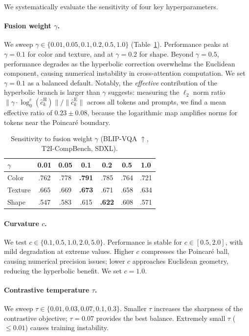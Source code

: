 \documentclass[sigconf,nonacm]{acmart}
\begin{document}
\setcounter{table}{0}

We systematically evaluate the sensitivity of four key hyperparameters.

\paragraph{Fusion weight $\gamma$.} We sweep $\gamma \in \{0.01, 0.05, 0.1, 0.2, 0.5, 1.0\}$ (Table~\ref{tab:gamma}). Performance peaks at $\gamma=0.1$ for color and texture, and at $\gamma=0.2$ for shape. Beyond $\gamma=0.5$, performance degrades as the hyperbolic correction overwhelms the Euclidean component, causing numerical instability in cross-attention computation. We set $\gamma=0.1$ as a balanced default. Notably, the \emph{effective} contribution of the hyperbolic branch is larger than $\gamma$ suggests: measuring the $\ell_2$ norm ratio $\|\gamma \cdot \log_0^c(\hat{c}_k^{\text{H}})\| / \|\hat{c}_k^{\text{E}}\|$ across all tokens and prompts, we find a mean effective ratio of $0.23 \pm 0.08$, because the logarithmic map amplifies norms for tokens near the Poincar\'e boundary.

\begin{table}[t]
\centering
\caption{Sensitivity to fusion weight $\gamma$ (BLIP-VQA $\uparrow$, T2I-CompBench, SDXL).}
\label{tab:gamma}
\begin{tabular}{l cccccc}
\toprule
$\gamma$ & 0.01 & 0.05 & \textbf{0.1} & 0.2 & 0.5 & 1.0 \\
\midrule
Color  & .762 & .778 & \textbf{.791} & .785 & .764 & .721 \\
Texture & .665 & .669 & \textbf{.673} & .671 & .658 & .634 \\
Shape  & .547 & .583 & .615 & \textbf{.622} & .608 & .571 \\
\bottomrule
\end{tabular}
\end{table}

\paragraph{Curvature $c$.} We test $c \in \{0.1, 0.5, 1.0, 2.0, 5.0\}$. Performance is stable for $c \in [0.5, 2.0]$, with mild degradation at extreme values. Higher $c$ compresses the Poincar\'e ball, causing numerical precision issues; lower $c$ approaches Euclidean geometry, reducing the hyperbolic benefit. We set $c=1.0$.

\paragraph{Contrastive temperature $\tau$.} We sweep $\tau \in \{0.01, 0.03, 0.07, 0.1, 0.3\}$. Smaller $\tau$ increases the sharpness of the contrastive objective; $\tau=0.07$ provides the best balance. Extremely small $\tau$ ($\leq 0.01$) causes training instability.
\end{document}
